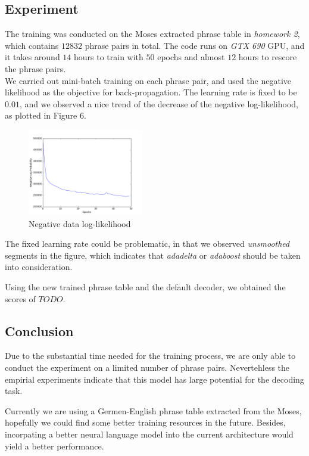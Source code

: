 \documentclass[11pt,letterpaper]{article}
\begin{document}
\subsection{Experiment} %
\label{sub:experiment}
The training was conducted on the Moses extracted phrase table in \textit{homework 2}, which contains $12832$ phrase pairs in total. The code runs on \textit{GTX 690} GPU, and it takes around $14$ hours to train with $50$ epochs and almost $12$ hours to rescore the phrase pairs.\\
We carried out mini-batch training on each phrase pair, and used the negative likelihood as the objective for back-propagation. The learning rate is fixed to be $0.01$, and we observed a nice trend of the decrease of the negative log-likelihood, as plotted in Figure 6.
\begin{figure}[!htb]
	\centering
    \includegraphics[width=0.45\textwidth]{logprob.png}
    \caption{Negative data log-likelihood}
\end{figure}
The fixed learning rate could be problematic, in that we observed \textit{unsmoothed} segments in the figure, which indicates that \textit{adadelta} or \textit{adaboost} should be taken into consideration.

Using the new trained phrase table and the default decoder, we obtained the scores of $TODO$.

\subsection{Conclusion} %
\label{sub:evaluation} 
Due to the substantial time needed for the training process, we are only able to conduct the experiment on a limited number of phrase pairs. Nevertehless the empirial experiments indicate that this model has large potential for the decoding task. 

Currently we are using a Germen-English phrase table extracted from the Moses, hopefully we could find some better training resources in the future. Besides, incorpating a better neural language model into the current architecture would yield a better performance.
\end{document}
